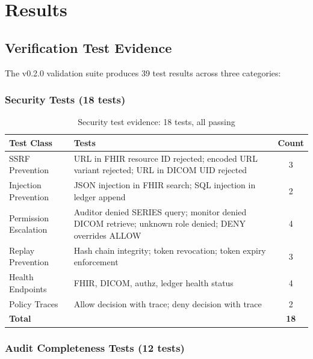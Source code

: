 \documentclass[10pt,letterpaper]{article}
\begin{document}
\section{Results}

\subsection{Verification Test Evidence}

The v0.2.0 validation suite produces 39 test results across three categories:

\subsubsection{Security Tests (18 tests)}

\begin{table}[H]
\centering
\caption{Security test evidence: 18 tests, all passing}
\label{tab:sectests}
\small
\begin{tabularx}{\textwidth}{l X c}
\toprule
\textbf{Test Class} & \textbf{Tests} & \textbf{Count} \\
\midrule
SSRF Prevention & URL in FHIR resource ID rejected; encoded URL variant rejected; URL in DICOM UID rejected & 3 \\
Injection Prevention & JSON injection in FHIR search; SQL injection in ledger append & 2 \\
Permission Escalation & Auditor denied SERIES query; monitor denied DICOM retrieve; unknown role denied; DENY overrides ALLOW & 4 \\
Replay Prevention & Hash chain integrity; token revocation; token expiry enforcement & 3 \\
Health Endpoints & FHIR, DICOM, authz, ledger health status & 4 \\
Policy Traces & Allow decision with trace; deny decision with trace & 2 \\
\midrule
\textbf{Total} & & \textbf{18} \\
\bottomrule
\end{tabularx}
\end{table}

\subsubsection{Audit Completeness Tests (12 tests)}
\end{document}
